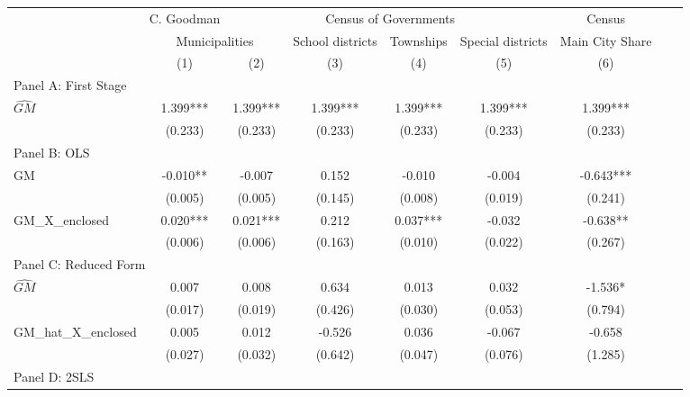  \begin{tabular}{l*{8}{c}} \toprule
&\multicolumn{1}{c}{C. Goodman}&\multicolumn{4}{c}{Census of Governments}&\multicolumn{1}{c}{Census}\\\cmidrule(lr){2-2}\cmidrule(lr){3-6}\cmidrule(lr){7-7}
&\multicolumn{2}{c}{Municipalities}&\multicolumn{1}{c}{School districts}&\multicolumn{1}{c}{Townships}&\multicolumn{1}{c}{Special districts}&\multicolumn{1}{c}{Main City Share}\\\cmidrule(lr){2-3}\cmidrule(lr){4-6}\cmidrule(lr){7-7}
&\multicolumn{1}{c}{(1)}&\multicolumn{1}{c}{(2)}&\multicolumn{1}{c}{(3)}&\multicolumn{1}{c}{(4)}&\multicolumn{1}{c}{(5)}&\multicolumn{1}{c}{(6)}\\
\cmidrule(lr){1-7}
\multicolumn{6}{l}{Panel A: First Stage}\\
\cmidrule(lr){1-7}
$\widehat{GM}$  &    1.399***&    1.399***&    1.399***&    1.399***&    1.399***&    1.399***\\
                &  (0.233)   &  (0.233)   &  (0.233)   &  (0.233)   &  (0.233)   &  (0.233)   \\
\cmidrule(lr){1-7}
\multicolumn{6}{l}{Panel B: OLS}\\
\cmidrule(lr){1-7}
GM              &   -0.010** &   -0.007   &    0.152   &   -0.010   &   -0.004   &   -0.643***\\
                &  (0.005)   &  (0.005)   &  (0.145)   &  (0.008)   &  (0.019)   &  (0.241)   \\
\addlinespace
GM\_X\_enclosed   &    0.020***&    0.021***&    0.212   &    0.037***&   -0.032   &   -0.638** \\
                &  (0.006)   &  (0.006)   &  (0.163)   &  (0.010)   &  (0.022)   &  (0.267)   \\
\cmidrule(lr){1-7}
\multicolumn{6}{l}{Panel C: Reduced Form}\\
\cmidrule(lr){1-7}
$\widehat{GM}$  &    0.007   &    0.008   &    0.634   &    0.013   &    0.032   &   -1.536*  \\
                &  (0.017)   &  (0.019)   &  (0.426)   &  (0.030)   &  (0.053)   &  (0.794)   \\
\addlinespace
GM\_hat\_X\_enclosed&    0.005   &    0.012   &   -0.526   &    0.036   &   -0.067   &   -0.658   \\
                &  (0.027)   &  (0.032)   &  (0.642)   &  (0.047)   &  (0.076)   &  (1.285)   \\
\cmidrule(lr){1-7}
\multicolumn{6}{l}{Panel D: 2SLS}\\
\cmidrule(lr){1-7}

\end{tabular}
